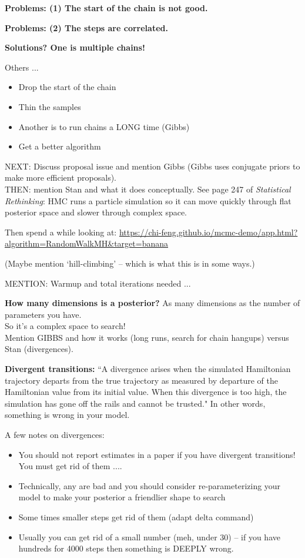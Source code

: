 \documentclass[11pt]{article}
\begin{document}
{\bf Problems: (1) The start of the chain is not good.}

{\bf Problems: (2) The steps are correlated.}

{\bf Solutions? One is multiple chains!} 

Others ... 
\begin{itemize}
\item Drop the start of the chain
\item Thin the samples
\item Another is to run chains a LONG time (Gibbs)
\item Get a better algorithm
\end{itemize}

NEXT: Discuss proposal issue and mention Gibbs (Gibbs uses conjugate priors to make more efficient proposals).\\ %

THEN: mention Stan and what it does conceptually. See page 247 of \emph{Statistical Rethinking}: HMC runs a particle simulation so it can move quickly through flat posterior space and slower through complex space. 

Then spend a while looking at: \url{https://chi-feng.github.io/mcmc-demo/app.html?algorithm=RandomWalkMH&target=banana}

(Maybe mention `hill-climbing' -- which is what this is in some ways.)

MENTION: Warmup and total iterations needed ... 

{\bf How many dimensions is a posterior?} As many dimensions as the number of parameters you have. \\
So it's a complex space to search! \\

Mention GIBBS and how it works (long runs, search for chain hangups) versus Stan (divergences).

{\bf Divergent transitions:} ``A divergence arises when the simulated Hamiltonian trajectory departs from the true trajectory as measured by departure of the Hamiltonian value from its initial value. When this divergence is too high, the simulation has gone off the rails and cannot be trusted." In other words, something is wrong in your model.  %

A few notes on divergences:
\begin{itemize}
\item You should not report estimates in a paper if you have divergent transitions! You must get rid of them ....
\item Technically, any are bad and you should consider re-parameterizing your model to make your posterior a friendlier shape to search
\item Some times smaller steps get rid of them (adapt delta command)
\item Usually you can get rid of a small number (meh, under 30) -- if you have hundreds for 4000 steps then something is DEEPLY wrong. 
\end{itemize}
\end{document}

